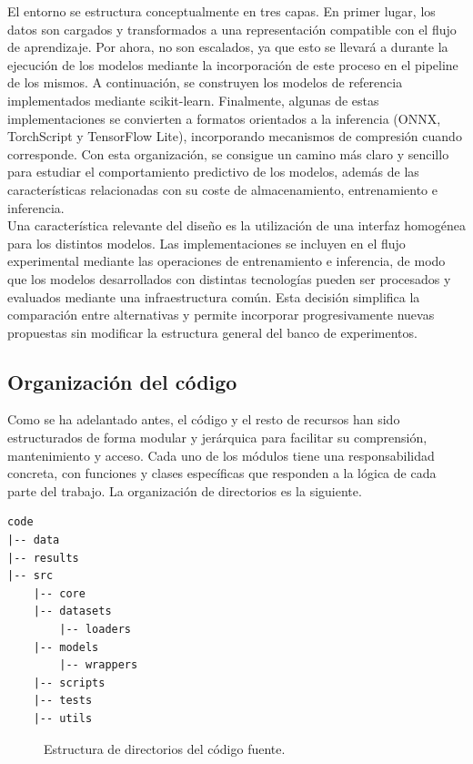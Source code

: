 \documentclass[a4paper,12pt,twoside,final]{book}
\begin{document}
El entorno se estructura conceptualmente en tres capas. En primer lugar, los datos son cargados y transformados a
una representación compatible con el flujo de aprendizaje. Por ahora, no son escalados, ya que esto se llevará a
durante la ejecución de los modelos mediante la incorporación de este proceso en el pipeline de los mismos.
A continuación, se construyen los modelos de referencia implementados mediante scikit-learn. Finalmente, algunas de
estas implementaciones se convierten a formatos orientados a la inferencia (ONNX, TorchScript y TensorFlow Lite),
incorporando mecanismos de compresión cuando corresponde. Con esta organización, se consigue un camino más claro y
sencillo para estudiar el comportamiento predictivo de los modelos, además de las características relacionadas con
su coste de almacenamiento, entrenamiento e inferencia.\\

Una característica relevante del diseño es la utilización de una interfaz homogénea para los distintos modelos. Las
implementaciones se incluyen en el flujo experimental mediante las operaciones de entrenamiento e inferencia, de
modo que los modelos desarrollados con distintas tecnologías pueden ser procesados y evaluados mediante una
infraestructura común. Esta decisión simplifica la comparación entre alternativas y permite incorporar
progresivamente nuevas propuestas sin modificar la estructura general del banco de experimentos.

\subsection{Organización del código}
Como se ha adelantado antes, el código y el resto de recursos han sido estructurados de forma modular y jerárquica
para facilitar su comprensión, mantenimiento y acceso. Cada uno de los módulos tiene una responsabilidad concreta,
con funciones y clases específicas que responden a la lógica de cada parte del trabajo. La organización de
directorios es la siguiente.

\begin{verbatim}
code
|-- data
|-- results
|-- src
    |-- core
    |-- datasets
        |-- loaders
    |-- models
        |-- wrappers
    |-- scripts
    |-- tests
    |-- utils
\end{verbatim}
\begin{figure}[ht]
  \centering
  \caption{Estructura de directorios del código fuente.}
  \label{fig:estructura_codigo}
\end{figure}
\end{document}

